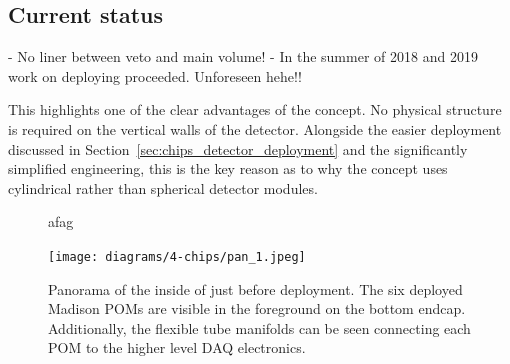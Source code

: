 \subsection{Current status} %
\label{sec:chips_detector_status} %

- No liner between veto and main volume!
- In the summer of 2018 and 2019 work on deploying \chips proceeded. Unforeseen hehe!!

This highlights one of the clear advantages of the \chips concept. No physical structure is
required on the vertical walls of the detector. Alongside the easier deployment discussed in
Section~\ref{sec:chips_detector_deployment} and the significantly simplified engineering, this is
the key reason as to why the \chips concept uses cylindrical rather than spherical detector
modules.

\begin{figure} %
    \centering
    \quad
    \caption[afaga]
    {afag}
    \label{fig:work}
\end{figure}

\begin{figure} %
    \texttt{[image: diagrams/4-chips/pan\_1.jpeg]}
    \caption[Panorama of the inside of \chipsfive just before deployment.]
    {Panorama of the inside of \chipsfive just before deployment. The six deployed Madison POMs
        are visible in the foreground on the bottom endcap. Additionally, the flexible tube manifolds
        can be seen connecting each POM to the higher level DAQ electronics.}
    \label{fig:pan_1}
\end{figure}

